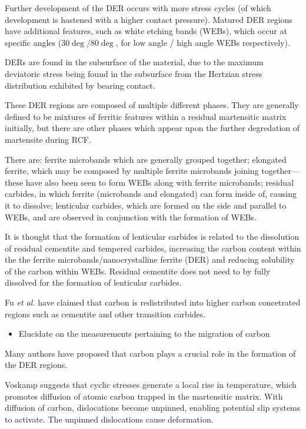 \documentclass[a4paper]{article}
\begin{document}
Further development of the DER occurs with more stress cycles (of
which development is hastened with a higher contact
pressure). Matured DER regions have additional features, such as
white etching bands (WEBs), which occur at specific angles (\(30\deg
  / 80\deg\), for low angle / high angle WEBs respectively).

DERs are found in the subsurface of the material, due to the maximum
deviatoric stress being found in the subsurface from the Hertzian
stress distribution exhibited by bearing contact. 


These DER regions are composed of multiple different phases. They are
generally defined to be mixtures of ferritic features within a
residual martensitic matrix initially, but there are other phases
which appear upon the further degredation of martensite during RCF. 

There are: ferrite microbands which are generally grouped together;
elongated ferrite, which may be composed by multiple ferrite
microbands joining together---these have also been seen to form WEBs
along with ferrite microbands; residual carbides, in which ferrite
(microbands and elongated) can form inside of, causing it to
dissolve; lenticular carbides, which are formed on the side and
parallel to WEBs, and are observed in conjunction with the formation
of WEBs.

It is thought that the formation of lenticular carbides is related
to the dissolution of residual cementite and tempered carbides,
increasing the carbon content within the the ferrite
microbands/nanocrystalline ferrite (DER) and reducing solubility of
the carbon within WEBs. Residual cementite does not need to by fully
dissolved for the formation of lenticular carbides. 

Fu \emph{et al.} have claimed that carbon is redistributed into higher
carbon concetrated regions such as cementite and other transition
carbides. 



\begin{itemize}
\item Elucidate on the measurements pertaining to the migration of
carbon
\end{itemize}


Many authors have proposed that carbon plays a crucial role in the
formation of the DER regions. 

Voskamp suggests that cyclic stresses generate a local rise in
temperature, which promotes diffusion of atomic carbon trapped in
the martensitic matrix. With diffusion of carbon, dislocations
become unpinned, enabling potential slip systems to activate. The
unpinned dislocations cause deformation. 
\end{document}
